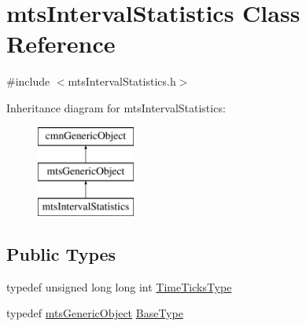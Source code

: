 \hypertarget{classmts_interval_statistics}{}\section{mts\+Interval\+Statistics Class Reference}
\label{classmts_interval_statistics}


{\ttfamily \#include $<$mts\+Interval\+Statistics.\+h$>$}

Inheritance diagram for mts\+Interval\+Statistics\+:\begin{figure}[H]
\begin{center}
\leavevmode
\includegraphics[height=3.000000cm]{d1/d59/classmts_interval_statistics}
\end{center}
\end{figure}
\subsection*{Public Types}
\begin{DoxyCompactItemize}
\item 
typedef unsigned long long int \hyperlink{classmts_interval_statistics_a7cd13b925ee829840466b17fb3051075}{Time\+Ticks\+Type}
\item 
typedef \hyperlink{classmts_generic_object}{mts\+Generic\+Object} \hyperlink{classmts_interval_statistics_af698a08da830735b7cda531c4089ac04}{Base\+Type}
\end{DoxyCompactItemize}
